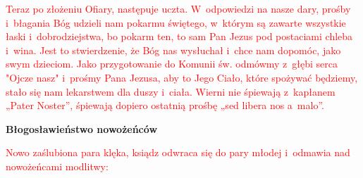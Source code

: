 \begin{center}
\textcolor{red}{Teraz po złożeniu Ofiary, następuje uczta. W~odpowiedzi na nasze dary, prośby i~błagania Bóg udzieli nam pokarmu świętego, w~którym są zawarte wszystkie łaski i~dobrodziejstwa, bo pokarm ten, to sam Pan Jezus pod postaciami chleba i~wina. Jest to stwierdzenie, że Bóg nas wysłuchał i~chce nam dopomóc, jako swym dzieciom. Jako przygotowanie do Komunii św. odmówmy z~głębi serca "Ojcze nasz" i~prośmy Pana Jezusa, aby to Jego Ciało, które spożywać będziemy, stało się nam lekarstwem dla duszy i~ciała. Wierni nie śpiewają z~kapłanem „Pater Noster”, śpiewają dopiero ostatnią prośbę „sed libera nos a~malo”.}
\end{center}

\begin{Parallel}[v]{0.485\textwidth}{0.485\textwidth}

\end{Parallel}

\begin{center}
\textbf{Błogosławieństwo nowożeńców}
\end{center}

\begin{center}
\textcolor{red}{Nowo zaślubiona para klęka, ksiądz odwraca się do pary młodej i~odmawia nad nowożeńcami modlitwy:}
\end{center}

